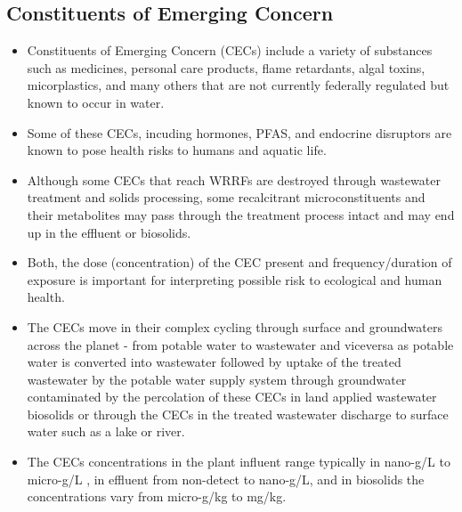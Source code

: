 \subsection{Constituents of Emerging Concern}
\begin{itemize}
\item Constituents of Emerging Concern (CECs) include a variety of substances such as medicines, personal care products, flame retardants, algal toxins, micorplastics, and many others that are not currently federally regulated but known to occur in water.
\item Some of these CECs, incuding hormones, PFAS, and endocrine disruptors are known to pose health risks to humans and aquatic life.
\item Although some CECs that reach WRRFs are destroyed through wastewater treatment and solids processing, some recalcitrant microconstituents and their metabolites may pass through the treatment process intact and may end up in the effluent or biosolids. 
\item Both, the dose (concentration) of the CEC present and frequency/duration of exposure is important for interpreting possible risk to ecological and human health.
\item The CECs move in their complex cycling through surface and groundwaters across the planet - from potable water to wastewater and viceversa as potable water is converted into wastewater followed by uptake of the treated wastewater by the potable water supply system through groundwater contaminated by the percolation of these CECs in land applied wastewater biosolids or through the CECs in the treated wastewater discharge to surface water such as a lake or river.
\item The CECs concentrations in the plant influent range typically in nano-g/L to micro-g/L , in effluent from non-detect to nano-g/L, and in biosolids the concentrations vary from micro-g/kg to mg/kg.
\end{itemize}


